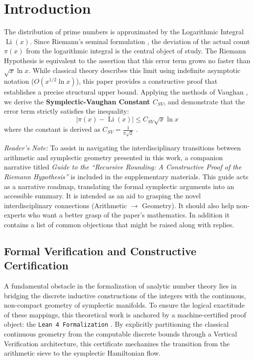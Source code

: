 \documentclass[sn-mathphys-num, pdflatex]{sn-jnl}
\begin{document}
\section{Introduction}
The distribution of prime numbers is approximated by the Logarithmic Integral $\operatorname{Li}(x)$. Since Riemann's seminal formulation \cite{riemann}, the deviation of the actual count $\pi(x)$ from the logarithmic integral is the central object of study. The Riemann Hypothesis is equivalent to the assertion that this error term grows no faster than $\sqrt{x}\ln x$. While classical theory describes this limit using indefinite asymptotic notation ($O(x^{1/2}\ln x)$), this paper provides a constructive proof that establishes a precise structural upper bound. Applying the methods of Vaughan \cite{vaughan}, we derive the \textbf{Symplectic-Vaughan Constant $C_{SV}$}, and demonstrate that the error term strictly satisfies the inequality:
\begin{equation}
|\pi(x) - \operatorname{Li}(x)| \le C_{SV} \sqrt{x} \ln x
\end{equation}
where the constant is derived as $C_{SV} = \frac{1}{\pi\sqrt{2}}$ \label{CSVal}.

\textit{Reader's Note:} To assist in navigating the interdisciplinary transitions between arithmetic and symplectic geometry presented in this work, a companion narrative titled \textit{Guide to the ``Recursive Rounding: A Constructive Proof of the Riemann Hypothesis''} is included in the supplementary materials. This guide acts as a narrative roadmap, translating the formal symplectic arguments into an accessible summary. It is intended as an aid to grasping the novel interdisciplinary connections (Arithmetic $\rightarrow$ Geometry). It should also help non-experts who want a better grasp of the paper's mathematics. In addition it contains a list of common objections that might be raised along with replies.

\subsection{Formal Verification and Constructive Certification} 
A fundamental obstacle in the formalization of analytic number theory lies in bridging the discrete inductive constructions of the integers with the continuous, non-compact geometry of symplectic manifolds. To ensure the logical exactitude of these mappings, this theoretical work is anchored by a machine-certified proof object: the \texttt{Lean 4 Formalization} \cite{moura2021lean4, rock2026lean}. By explicitly partitioning the classical continuous geometry from the computable discrete bounds through a Vertical Verification architecture, this certificate mechanizes the transition from the arithmetic sieve to the symplectic Hamiltonian flow. 
\end{document}
